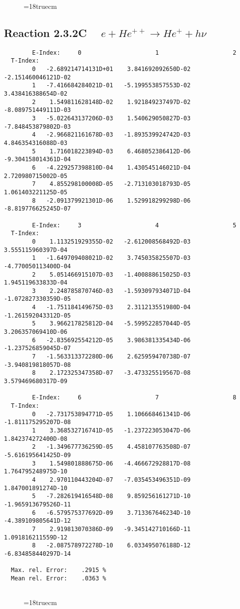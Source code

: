 \begin{figure} \label{2.3.2B1}
\epsfxsize=18truecm
\end{figure}
\newpage

\subsection{
Reaction 2.3.2C   $\quad e + He^{++} \rightarrow  He^+ + h\nu$
}

\begin{verbatim}
        E-Index:     0                     1                     2
  T-Index:
        0   -2.689214714131D+01    3.841692092650D-02   -2.151460046121D-02
        1   -7.416684284021D-01   -5.199553857553D-02    3.438416388654D-02
        2    1.549811628148D-02    1.921849237497D-02   -8.089751449111D-03
        3   -5.022643137206D-03    1.540629050827D-03   -7.848453879802D-03
        4   -2.966821161678D-03   -1.893539924742D-03    4.846354316088D-03
        5    1.716018223894D-03    6.468052386412D-06   -9.304158014361D-04
        6   -4.229257398810D-04    1.430545146021D-04    2.720980715002D-05
        7    4.855298100008D-05   -2.713103018793D-05    1.061403221125D-05
        8   -2.091379921301D-06    1.529918299298D-06   -8.819776625245D-07

        E-Index:     3                     4                     5
  T-Index:
        0    1.113251929355D-02   -2.612008568492D-03    3.555115960397D-04
        1   -1.649709408021D-02    3.745035825507D-03   -4.770050113400D-04
        2    5.051466915107D-03   -1.400888615025D-03    1.945119633833D-04
        3    2.248785870746D-03   -1.593097934071D-04   -1.072827330359D-05
        4   -1.751184149675D-03    2.311213551980D-04   -1.261592043312D-05
        5    3.966217825812D-04   -5.599522857044D-05    3.206357069410D-06
        6   -2.835692554212D-05    3.986381335434D-06   -1.237526859045D-07
        7   -1.563313372280D-06    2.625959470738D-07   -3.940819818057D-08
        8    2.172325347358D-07   -3.473325519567D-08    3.579469680317D-09

        E-Index:     6                     7                     8
  T-Index:
        0   -2.731753894771D-05    1.106668461341D-06   -1.811175295207D-08
        1    3.368532716741D-05   -1.237223053047D-06    1.842374272400D-08
        2   -1.349677736259D-05    4.458107763508D-07   -5.616195641425D-09
        3    1.549801888675D-06   -4.466672928817D-08    1.764795248975D-10
        4    2.970110443204D-07   -7.035453496351D-09    1.847001891274D-10
        5   -7.282619416548D-08    9.859256161271D-10   -1.965913679526D-11
        6   -6.579575377692D-09    3.713367646234D-10   -4.389109805641D-12
        7    2.919813070386D-09   -9.345142710166D-11    1.091816211559D-12
        8   -2.087578972278D-10    6.033495076188D-12   -6.834858440297D-14

  Max. rel. Error:    .2915 %
  Mean rel. Error:    .0363 %


\end{verbatim}
\begin{figure} \label{2.3.2C}
\epsfxsize=18truecm
\end{figure}
\newpage

